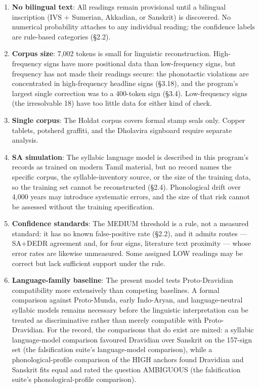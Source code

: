 \documentclass[11pt]{article}
\providecommand{\tightlist}{%
  \setlength{\itemsep}{0pt}\setlength{\parskip}{0pt}}
\begin{document}
\begin{enumerate}
\def\labelenumi{\arabic{enumi}.}
\tightlist
\item
  \textbf{No bilingual text}: All readings remain provisional until a bilingual inscription (IVS + Sumerian, Akkadian, or Sanskrit) is discovered. No numerical probability attaches to any individual reading; the confidence labels are rule-based categories (§2.2).
\item
  \textbf{Corpus size}: 7,002 tokens is small for linguistic reconstruction. High-frequency signs have more positional data than low-frequency signs, but frequency has not made their readings secure: the phonotactic violations are concentrated in high-frequency headline signs (§3.18), and the program's largest single correction was to a 400-token sign (§3.4). Low-frequency signs (the irresolvable 18) have too little data for either kind of check.
\item
  \textbf{Single corpus}: The Holdat corpus covers formal stamp seals
  only. Copper tablets, potsherd graffiti, and the Dholavira signboard
  require separate analysis.
\item
  \textbf{SA simulation}: The syllabic language model is described in this program's records as trained on modern Tamil material, but no record names the specific corpus, the syllable-inventory source, or the size of the training data, so the training set cannot be reconstructed (§2.4). Phonological drift over 4,000 years may introduce systematic errors, and the size of that risk cannot be assessed without the training specification.
\item
  \textbf{Confidence standards}: The MEDIUM threshold is a rule, not a measured standard: it has no known false-positive rate (§2.2), and it admits routes --- SA+DEDR agreement and, for four signs, literature text proximity --- whose error rates are likewise unmeasured. Some assigned LOW readings may be correct but lack sufficient support under the rule.
\item
  \textbf{Language-family baseline}: The present model tests Proto-Dravidian
  compatibility more extensively than competing baselines. A formal comparison
  against Proto-Munda, early Indo-Aryan, and language-neutral syllabic models
  remains necessary before the linguistic interpretation can be treated as discriminative rather than merely compatible with Proto-Dravidian. For the record, the comparisons that do exist are mixed: a syllabic language-model comparison favoured Dravidian over Sanskrit on the 157-sign set (the falsification suite's language-model comparison), while a phonological-profile comparison of the HIGH anchors found Dravidian and Sanskrit fits equal and rated the question AMBIGUOUS (the falsification suite's phonological-profile comparison).
\end{enumerate}
\end{document}
